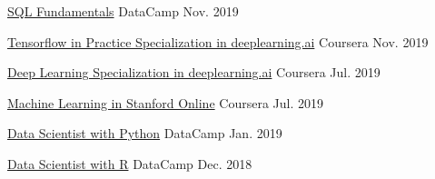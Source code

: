 



\begin{cvhonors}

  \cvhonor
    {} %
    {\href{https://www.datacamp.com/statement-of-accomplishment/track/d05bff099253e5f221288f01272b0afb6eb80e05}{SQL Fundamentals}} %
    {DataCamp} %
    {Nov. 2019} %

  \cvhonor
    {} %
    {\href{https://www.coursera.org/account/accomplishments/specialization/certificate/JUYCQBR3TMVW?utm_medium=certificate&utm_source=link&utm_campaign=copybutton_certificate}{Tensorflow in Practice Specialization in deeplearning.ai}} %
    {Coursera} %
    {Nov. 2019} %

  \cvhonor
    {} %
    {\href{https://www.coursera.org/account/accomplishments/specialization/certificate/TG88EP6ASTZ7?utm_medium=certificate&utm_source=link&utm_campaign=copybutton_certificate}{Deep Learning Specialization in deeplearning.ai}} %
    {Coursera} %
    {Jul. 2019} %

  \cvhonor
    {} %
    {\href{https://www.coursera.org/account/accomplishments/certificate/T4ARKFWRSLB2?utm_medium=certificate&utm_source=link&utm_campaign=copybutton_certificate}{Machine Learning in Stanford Online}} %
    {Coursera} %
    {Jul. 2019} %


  \cvhonor
    {} %
    {\href{https://www.datacamp.com/statement-of-accomplishment/track/a31b1837666595d34f5378a093df9fa2056e29e2}{Data Scientist with Python}} %
    {DataCamp} %
    {Jan. 2019} %

  \cvhonor
    {} %
    {\href{https://www.datacamp.com/statement-of-accomplishment/track/dfdda8840e45bd7989991aa90b1287ed8fbbb872}{Data Scientist with R}} %
    {DataCamp} %
    {Dec. 2018} %


\end{cvhonors}